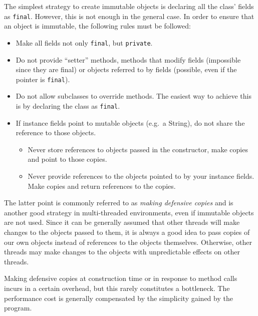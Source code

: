 The simplest strategy to create immutable objects is declaring all the
class' fields as \verb+final+. However, this is not enough in the general
case. In order to ensure that an object is immutable, the following
rules must be followed: 

\begin{itemize}
\item Make all fields not only \verb+final+, but \verb+private+.
\item Do not provide ``setter'' methods, methods that modify fields
  (impossible since they are final) or objects referred to by fields
  (possible, even if the pointer is \verb+final+).
\item Do not allow subclasses to override methods. The easiest way to
  achieve this is by declaring the class as \verb+final+.
\item If instance fields point to mutable objects (e.g.~a String),
  do not share the reference to those objects. 
  \begin{itemize}
  \item Never store references to objects passed in the constructor,
    make copies and point to those copies.
  \item Never provide references to the objects pointed to by your
    instance fields. Make copies and return references to the copies. 
  \end{itemize}
\end{itemize}

The latter point is commonly referred to as \emph{making defensive
  copies} and is another good strategy in multi-threaded environments,
even if immutable objects are not used. 
%
Since it can be generally assumed that other threads will make
changes to the objects passed to them, it is always a good idea to
pass copies of our own objects instead of references to the objects
themselves. Otherwise, other threads may make changes to the objects
with unpredictable effects on other threads. 

Making defensive copies at construction time or in response to method
calls incurs in a certain overhead, but this rarely constitutes a
bottleneck. The performance cost is generally compensated by the
simplicity gained by the program. 

